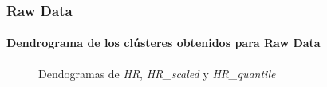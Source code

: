 \subsubsection{Raw Data}

\paragraph{Dendrograma de los clústeres obtenidos para Raw Data}

\begin{figure}[H]
    \centering
    
    \caption{Dendogramas de \textit{HR}, \textit{HR\_scaled} y \textit{HR\_quantile}}
    \label{fig:raw_data_den_fc}
\end{figure}

